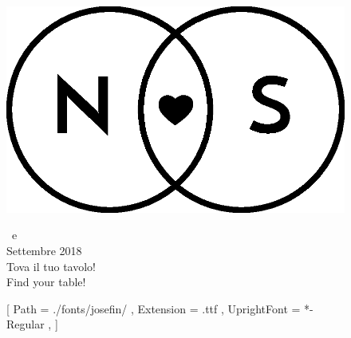 \documentclass[18pt]{book}
\begin{document}
\begin{figure}
\centering
\includegraphics[scale=1.3]{img/Logo_piccolo.eps}
\begin{center}
{\fontsize{80}{90}\selectfont \NSposo \ e \NSposa\\}
{\fontsize{40}{70} Settembre 2018\\}
\vspace{10em}
{\fontsize{100}{120}\selectfont Tova il tuo tavolo!\\}
\vspace{5em}
{\fontsize{100}{120}\selectfont Find your table!}
\end{center}

\setmainfont{JosefinSans}[
Path = ./fonts/josefin/ ,
Extension = .ttf ,
UprightFont = *-Regular ,
]

\Huge{}
\vfill
\end{figure}
\end{document}

